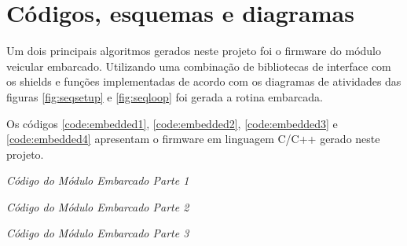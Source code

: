 \section{Códigos, esquemas e diagramas}

Um dois principais algoritmos gerados neste projeto foi o firmware do módulo veicular embarcado. Utilizando uma combinação de bibliotecas de interface com os shields e funções implementadas de acordo com os diagramas de atividades das figuras \ref{fig:seqsetup} e \ref{fig:seqloop} foi gerada a rotina embarcada.

Os códigos \ref{code:embedded1}, \ref{code:embedded2}, \ref{code:embedded3} e \ref{code:embedded4} apresentam o firmware em linguagem C/C++ gerado neste projeto.

\renewcommand{\baselinestretch}{0.5}  %
\begin{codigo}[!htb]
\fontsize{9pt}{9pt}\selectfont
      \begin{boxit}  %
      \vspace{2mm}
   \end{boxit}
   \caption{\it Código do Módulo Embarcado Parte 1}
   \label{code:embedded1}
\end{codigo}

\renewcommand{\baselinestretch}{0.5}  %
\begin{codigo}[!htb]
\fontsize{9pt}{9pt}\selectfont
      \begin{boxit}  %
      \vspace{2mm}
   \end{boxit}
   \caption{\it Código do Módulo Embarcado Parte 2}
   \label{code:embedded2}
\end{codigo}

\renewcommand{\baselinestretch}{0.5}  %
\begin{codigo}[!htb]
\fontsize{9pt}{9pt}\selectfont
      \begin{boxit}  %
      \vspace{2mm}
   \end{boxit}
   \caption{\it Código do Módulo Embarcado Parte 3}
   \label{code:embedded3}
\end{codigo}

